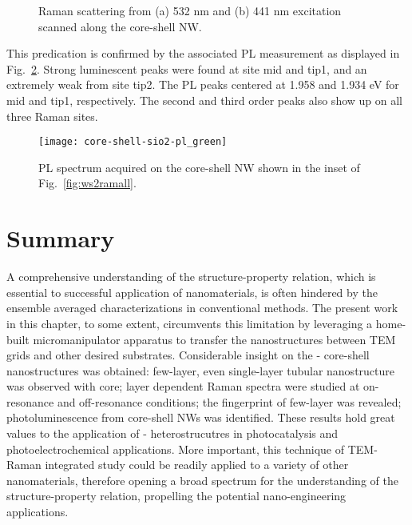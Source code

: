 \begin{figure}[htb]
\centering
{}\hspace{0.04\textwidth}
\caption[Raman scattering from (a) 532 nm and (b) 441 nm excitation scanned along the core-shell NW]{Raman scattering from (a) 532 nm and (b) 441 nm excitation scanned along the core-shell NW.}
\label{fig:ws2ram3site}
\end{figure}
This predication is confirmed by the associated PL measurement as displayed in Fig.~\ref{fig:ws2plgreen}. Strong luminescent peaks were found at site mid and tip1, and an extremely weak from site tip2. The PL peaks centered at 1.958 and 1.934 eV for mid and tip1, respectively. The second and third order peaks also show up on all three Raman sites. 
\begin{figure}[htb]
\centering
\texttt{[image: core-shell-sio2-pl\_green]}
\caption[PL spectra of - on -Si]{PL spectrum acquired on the core-shell NW shown in the inset of Fig.~\ref{fig:ws2ramall}.}
\label{fig:ws2plgreen}
\end{figure}

\section{Summary} 

A comprehensive understanding of the structure-property relation, which is essential to successful application of nanomaterials, is often hindered by the ensemble averaged characterizations in conventional methods. The present work in this chapter, to some extent, circumvents this limitation by leveraging a home-built micromanipulator apparatus to transfer the nanostructures between TEM grids and other desired substrates. Considerable insight on the - core-shell nanostructures was obtained: few-layer, even single-layer tubular  nanostructure was observed with  core; layer dependent Raman spectra were studied at on-resonance and off-resonance conditions; the fingerprint of few-layer  was revealed; photoluminescence from core-shell NWs was identified. These results hold great values to the application of - heterostrucutres in photocatalysis and photoelectrochemical applications. More important, this technique of TEM-Raman integrated study could be readily applied to a variety of other nanomaterials, therefore opening a broad spectrum for the understanding of the structure-property relation, propelling the potential nano-engineering applications. 

